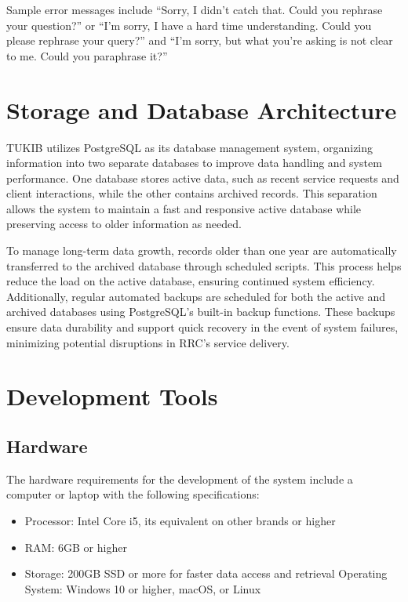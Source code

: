\begin{itemize}
	Sample error messages include “Sorry, I didn't catch that. Could you rephrase your question?” or “I'm sorry, I have a hard time understanding. Could you please rephrase your query?” and “I'm sorry, but what you're asking is not clear to me. Could you paraphrase it?”
	
\end{itemize}


\section{Storage and Database Architecture}

TUKIB utilizes PostgreSQL as its database management system, organizing information into two separate databases to improve data handling and system performance. One database stores active data, such as recent service requests and client interactions, while the other contains archived records. This separation allows the system to maintain a fast and responsive active database while preserving access to older information as needed.

To manage long-term data growth, records older than one year are automatically transferred to the archived database through scheduled scripts. This process helps reduce the load on the active database, ensuring continued system efficiency. Additionally, regular automated backups are scheduled for both the active and archived databases using PostgreSQL’s built-in backup functions. These backups ensure data durability and support quick recovery in the event of system failures, minimizing potential disruptions in RRC’s service delivery.

\section{Development Tools}

\subsection{Hardware}

The hardware requirements for the development of the system include a computer or laptop with the following specifications:

\begin{itemize}
	\item Processor: Intel Core i5, its equivalent on other brands or higher
	\item RAM: 6GB or higher
	\item Storage: 200GB SSD or more for faster data access and retrieval
	Operating System: Windows 10 or higher, macOS, or Linux
\end{itemize}

